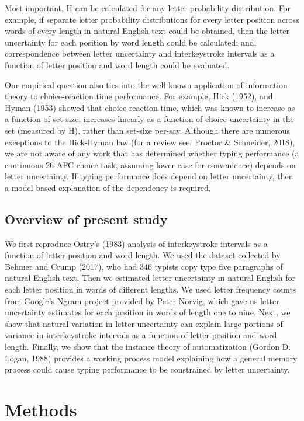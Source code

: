 \documentclass[floatsintext,man]{apa6}
\theoremstyle{definition}
\theoremstyle{definition}
\theoremstyle{definition}
\theoremstyle{remark}
\begin{document}
Most important, H can be calculated for any letter probability
distribution. For example, if separate letter probability distributions
for every letter position across words of every length in natural
English text could be obtained, then the letter uncertainty for each
position by word length could be calculated; and, correspondence between
letter uncertainty and interkeystroke intervals as a function of letter
position and word length could be evaluated.

Our empirical question also ties into the well known application of
information theory to choice-reaction time performance. For example,
Hick (1952), and Hyman (1953) showed that choice reaction time, which
was known to increase as a function of set-size, increases linearly as a
function of choice uncertainty in the set (measured by H), rather than
set-size per-say. Although there are numerous exceptions to the
Hick-Hyman law (for a review see, Proctor \& Schneider, 2018), we are
not aware of any work that has determined whether typing performance (a
continuous 26-AFC choice-task, assuming lower case for convenience)
depends on letter uncertainty. If typing performance does depend on
letter uncertainty, then a model based explanation of the dependency is
required.

\subsection{Overview of present study}\label{overview-of-present-study}

We first reproduce Ostry's (1983) analysis of interkeystroke intervals
as a function of letter position and word length. We used the dataset
collected by Behmer and Crump (2017), who had 346 typists copy type five
paragraphs of natural English text. Then we estimated letter uncertainty
in natural English for each letter position in words of different
lengths. We used letter frequency counts from Google's Ngram project
provided by Peter Norvig, which gave us letter uncertainty estimates for
each position in words of length one to nine. Next, we show that natural
variation in letter uncertainty can explain large portions of variance
in interkeystroke intervals as a function of letter position and word
length. Finally, we show that the instance theory of automatization
(Gordon D. Logan, 1988) provides a working process model explaining how
a general memory process could cause typing performance to be
constrained by letter uncertainty.

\section{Methods}\label{methods}
\end{document}
